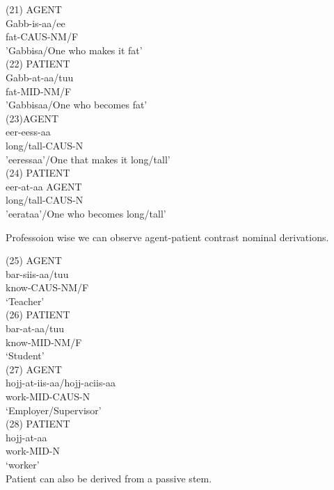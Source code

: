 \documentclass[11pt,a4paper]{article}
\begin{document}
(21) AGENT\\
\indent Gabb-is-aa/ee \\
\indent fat-CAUS-NM/F\\
\indent 'Gabbisa/One who makes it fat'\\

(22) PATIENT\\
\indent Gabb-at-aa/tuu\\
\indent fat-MID-NM/F\\
\indent 'Gabbisaa/One who becomes fat'\\


(23)AGENT\\
\indent {}eer-eess-aa \\
\indent long/tall-CAUS-N\\
\indent 'eeressaa'/One that makes it long/tall'\\

(24) PATIENT\\
\indent {}eer-at-aa AGENT\\
\indent long/tall-CAUS-N\\
\indent 'eerataa'/One who becomes long/tall'

Professoion wise we can observe agent-patient contrast nominal derivations.


(25) AGENT \\
\indent bar-siis-aa/tuu \\
\indent know-CAUS-NM/F\\
\indent ‘Teacher’\\

(26) PATIENT \\
\indent bar-at-aa/tuu \\
\indent know-MID-NM/F\\
\indent ‘Student’\\

(27) AGENT \\
\indent hojj-at-iis-aa/hojj-aciis-aa \\
\indent work-MID-CAUS-N\\
\indent ‘Employer/Supervisor’\\

(28) PATIENT \\
\indent hojj-at-aa \\
\indent work-MID-N\\
\indent ‘worker’\\

Patient can also be derived from a passive stem.\\
\end{document}

